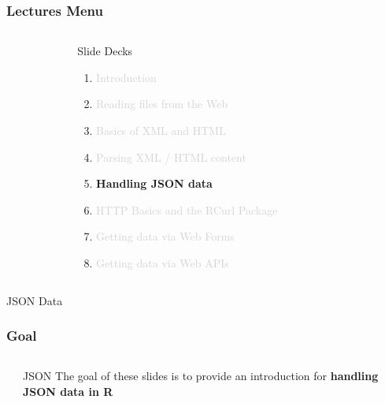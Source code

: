 \documentclass{beamer}\usepackage[]{graphicx}\usepackage[]{color}
\begin{document}
\begin{frame}
\frametitle{Lectures Menu}

\begin{columns}[t]
\begin{column}{0.1\textwidth}
\end{column}
\begin{column}{0.8\textwidth}
 \begin{block}{Slide Decks}
  \begin{enumerate}
   \item \textcolor{lightgray}{Introduction}
   \item \textcolor{lightgray}{Reading files from the Web}
   \item \textcolor{lightgray}{Basics of XML and HTML}
   \item \textcolor{lightgray}{Parsing XML / HTML content}
   \item \textbf{Handling JSON data}
   \item \textcolor{lightgray}{HTTP Basics and the RCurl Package}
   \item \textcolor{lightgray}{Getting data via Web Forms}
   \item \textcolor{lightgray}{Getting data via Web APIs}
  \end{enumerate}
 \end{block}
\end{column}
\begin{column}{0.1\textwidth}
\end{column}
\end{columns}

\end{frame}


\begin{frame}
 \begin{center}
  \Huge{\textcolor{mandarina}{JSON Data}}
 \end{center}
\end{frame}


\begin{frame}
\frametitle{Goal}

\begin{columns}[t]
\begin{column}{0.1\textwidth}
\end{column}
\begin{column}{0.8\textwidth}

\begin{block}{JSON}
The goal of these slides is to provide an introduction for \textbf{handling JSON data in R}
\end{block}

\end{column}
\begin{column}{0.1\textwidth}
\end{column}
\end{columns}

\end{frame}
\end{document}
